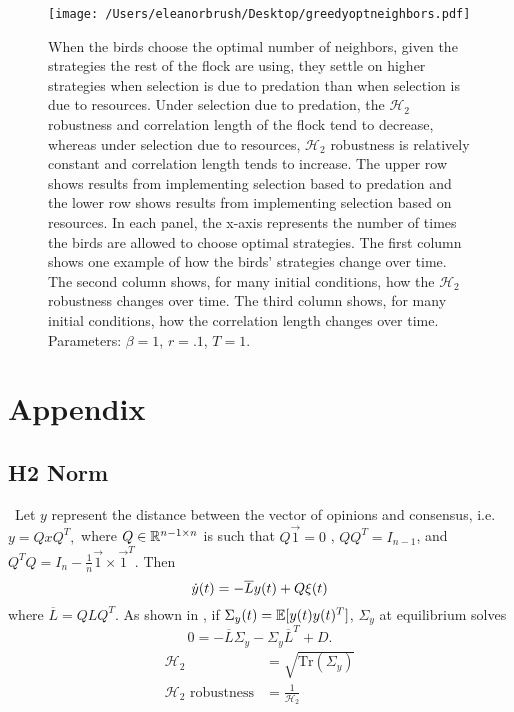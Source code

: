 \documentclass{article}
\newcommand{\Tr}{\text{Tr}}
\begin{document}
\begin{figure}[ht]
\texttt{[image: /Users/eleanorbrush/Desktop/greedyoptneighbors.pdf]}
\caption{\label{greedyopt} When the birds choose the optimal number of neighbors, given the strategies the rest of the flock are using, they settle on higher strategies when selection is due to predation than when selection is due to resources. Under selection due to predation, the $\mathscr{H}_2$ robustness and correlation length of the flock tend to decrease, whereas under selection due to resources, $\mathscr{H}_2$ robustness is relatively constant and correlation length tends to increase. The upper row shows results from implementing selection based to predation and the lower row shows results from implementing selection based on resources. In each panel, the x-axis represents the number of times the birds are allowed to choose optimal strategies. The first column shows one example of how the birds' strategies change over time. The second column shows, for many initial conditions, how the $\mathscr{H}_2$ robustness changes over time. The third column shows, for many initial conditions, how the correlation length changes over time. Parameters:  $\beta=1$, $r=.1$, $T=1$. 
}
\end{figure}

\newpage
\section{Appendix}
\subsection{H2 Norm \label{H2}} 

\ Let $y$ represent the distance between the vector of opinions and consensus, i.e.
$y=QxQ^T,$
where $Q\in{\mathbb{R}}^{n-1\times n}$ is such that $Q\vec{1}=0$ , $QQ^T=I_{n-1}$, and $Q^TQ=I_n-\frac{1}{n}\vec{1}\times\vec{1}^T$.   
Then 
\begin{equation}
\dot{y}(t)=-\overline{L}y(t)+Q\xi(t) \notag
\end{equation}
where $\overline{L}=QLQ^T$.  As shown in \cite{Young:2010fk}, if $\Sigma_y(t)={\mathbb{E}}[y(t)y(t)^T]$,  $\Sigma_y$ at equilibrium solves
\begin{equation} 0=-\overline{L}\Sigma_y-\Sigma_y\overline{L}^T+D. \label{h2norm}
\end{equation}
\begin{align*}
\mathscr{H}_2&=\sqrt{\Tr(\Sigma_y)}
\\\mathscr{H}_2 \text{ robustness} &=\frac{1}{\mathscr{H}_2}
\end{align*}
\end{document}
